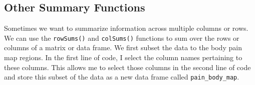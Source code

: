 \documentclass[
  letterpaper,
]{latex/krantz}
\makeatletter
\newenvironment{Shaded}{\begin{snugshade}}{\end{snugshade}}
\newcommand{\CommentTok}[1]{\textcolor[rgb]{0.37,0.37,0.37}{#1}}
\newcommand{\FunctionTok}[1]{\textcolor[rgb]{0.28,0.35,0.67}{#1}}
\newcommand{\NormalTok}[1]{\textcolor[rgb]{0.00,0.23,0.31}{#1}}
\newcommand{\OtherTok}[1]{\textcolor[rgb]{0.00,0.23,0.31}{#1}}
\newcommand{\SpecialCharTok}[1]{\textcolor[rgb]{0.37,0.37,0.37}{#1}}
\newenvironment{kframe}{%
\medskip{}
\setlength{\fboxsep}{.8em}
 \def\at@end@of@kframe{}%
 \ifinner\ifhmode%
  \def\at@end@of@kframe{\end{minipage}}%
  \begin{minipage}{\columnwidth}%
 \fi\fi%
 \def\FrameCommand##1{\hskip\@totalleftmargin \hskip-\fboxsep
 \colorbox{shadecolor}{##1}\hskip-\fboxsep
     \hskip-\linewidth \hskip-\@totalleftmargin \hskip\columnwidth}%
 \MakeFramed {\advance\hsize-\width
   \@totalleftmargin\z@ \linewidth\hsize
   \@setminipage}}%
 {\par\unskip\endMakeFramed%
 \at@end@of@kframe}
\renewenvironment{Shaded}{\begin{kframe}}{\end{kframe}}
\makeatother
\begin{document}
\begin{Shaded}
\end{Shaded}

\subsection{Other Summary Functions}\label{other-summary-functions}

Sometimes we want to summarize information across multiple columns or
rows. We can use the
\texttt{rowSums()} and
\texttt{colSums()}
functions to sum over the rows or columns of a matrix or data frame. We
first subset the data to the body pain map regions. In the first line of
code, I select the column names pertaining to these columns. This allows
me to select those columns in the second line of code and store this
subset of the data as a new data frame called \texttt{pain\_body\_map}.
\end{document}
